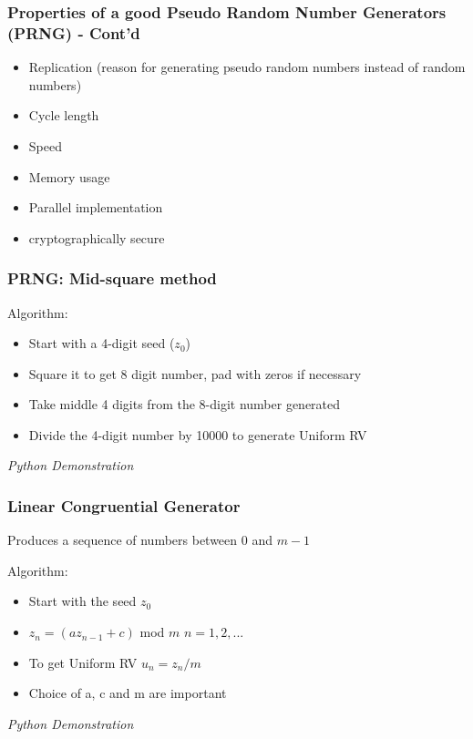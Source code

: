 \documentclass{beamer}
\begin{document}
\begin{frame}
\frametitle{Properties of a good Pseudo Random Number Generators (PRNG) - Cont'd}

\begin{itemize}
\item Replication (reason for generating pseudo random numbers instead of random numbers)
\item Cycle length
\item Speed
\item Memory usage
\item Parallel implementation
\item cryptographically secure

\end{itemize}

\end{frame}



\begin{frame}
\frametitle{PRNG: Mid-square method}

Algorithm:
\begin{itemize}
\item Start with a 4-digit seed ($z_0$)
\item Square it to get 8 digit number, pad with zeros if necessary
\item Take middle 4 digits from the 8-digit number generated
\item Divide the 4-digit number by 10000 to generate Uniform RV

\end{itemize}
\textit{Python Demonstration}

\end{frame}


\begin{frame}
\frametitle{Linear Congruential Generator}
Produces a sequence of numbers between $0$ and $m-1$

Algorithm:
\begin{itemize}
\item Start with the seed $z_0$
\item $z_n = (az_{n-1}+c)$ mod $m$ $n = 1, 2, ...$
\item To get Uniform RV $u_n = z_n/m$
\item Choice of a, c and m are important

\end{itemize}
\textit{Python Demonstration}
\end{frame}
\end{document}
